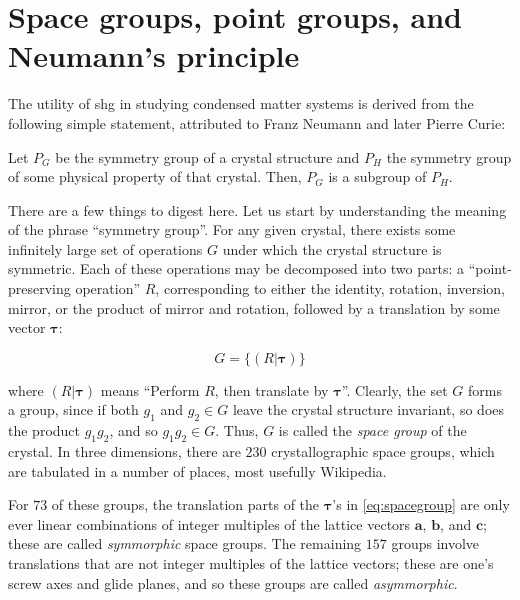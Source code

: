 \section{Space groups, point groups, and Neumann's principle}

The utility of \gls{shg} in studying condensed matter systems is derived from the following simple statement, attributed to Franz Neumann\cite{neumann_vorlesungen_1885} and later Pierre Curie\cite{curie_sur_1894}:

\begin{theorem}\label{thm:neumann}
Let $P_G$ be the symmetry group of a crystal structure and $P_H$ the symmetry group of some physical property of that crystal.
Then, $P_G$ is a subgroup of $P_H$.
\end{theorem}

There are a few things to digest here.
Let us start by understanding the meaning of the phrase ``symmetry group''.
For any given crystal, there exists some infinitely large set of operations $G$ under which the crystal structure is symmetric.
Each of these operations may be decomposed into two parts: a ``point-preserving operation'' $R$, corresponding to either the identity, rotation, inversion, mirror, or the product of mirror and rotation, followed by a translation by some vector $\bm{\tau}$:

\begin{equation}\label{eq:spacegroup}
G = \{(R|\bm{\tau})\}
\end{equation}

where $(R|\bm{\tau})$ means ``Perform $R$, then translate by $\bm{\tau}$''.
Clearly, the set $G$ forms a group, since if both $g_1$ and $g_2 \in G$ leave the crystal structure invariant, so does the product $g_1g_2$, and so $g_1g_2 \in G$.
Thus, $G$ is called the \emph{space group} of the crystal.
In three dimensions, there are $230$ crystallographic space groups, which are tabulated in a number of places, most usefully Wikipedia\cite{wiki:spacegroups}.

For $73$ of these groups, the translation parts of the $\bm{\tau}$'s in \cref{eq:spacegroup} are only ever linear combinations of integer multiples of the lattice vectors $\bm{a}$, $\bm{b}$, and $\bm{c}$; these are called \emph{symmorphic} space groups.
The remaining $157$ groups involve translations that are not integer multiples of the lattice vectors; these are one's screw axes and glide planes, and so these groups are called \emph{asymmorphic}.

